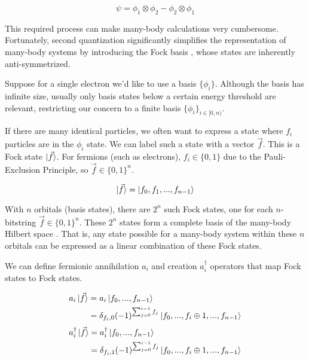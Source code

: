 \begin{equation}
    \psi = \phi_1 \otimes \phi_2 - \phi_2 \otimes \phi_1
\end{equation}

This required process can make many-body calculations very cumbersome. Fortunately, second quantization significantly simplifies the representation of many-body systems by introducing the Fock basis \cite{QCC}, whose states are inherently anti-symmetrized.

Suppose for a single electron we'd like to use a basis $\{\phi_i\}$. Although the basis has infinite size, usually only basis states below a certain energy threshold are relevant, restricting our concern to a finite basis $\{\phi_i\}_{i \in [0, n)}$.

If there are many identical particles, we often want to express a state where $f_i$ particles are in the $\phi_i$ state. We can label such a state with a vector $\vec{f}$. This is a Fock state $\ket{\vec{f}}$. For fermions (such as electrons), $f_i \in \{0, 1\}$ due to the Pauli-Exclusion Principle, so $\vec{f} \in \{0, 1\}^n$.

\begin{equation}
    \ket{\vec{f}} = \ket{f_0, f_1, ..., f_{n - 1}} \label{eq: fock}
\end{equation}

With $n$ orbitals (basis states), there are $2^n$ such Fock states, one for each $n$-bitstring $\vec{f} \in \{0, 1\}^n$. These $2^n$ states form a complete basis of the many-body Hilbert space \cite{QCC}. That is, any state possible for a many-body system within these $n$ orbitals can be expressed as a linear combination of these Fock states.

We can define fermionic annihilation $a_i$ and creation $a^\dag_i$ operators \cite{QCC} that map Fock states to Fock states.

\begin{equation}
    \begin{split}
        a_i\ket{\vec{f}} &= a_i\ket{f_0, ..., f_{n - 1}} \\
        &= \delta_{f_i, 0}(-1)^{\sum_{j = 0}^{i - 1} f_j}\ket{f_0, ..., f_i \oplus 1, ..., f_{n - 1}}
    \end{split}
    \label{eq: annihilation}
\end{equation}
\begin{equation}
    \begin{split}
        a^\dag_i\ket{\vec{f}} &= a^\dag_i\ket{f_0, ..., f_{n - 1}} \\
        &= \delta_{f_i, 1}(-1)^{\sum_{j = 0}^{i - 1} f_j}\ket{f_0, ..., f_i \oplus 1, ..., f_{n - 1}}
    \end{split}
    \label{eq: creation}
\end{equation}

